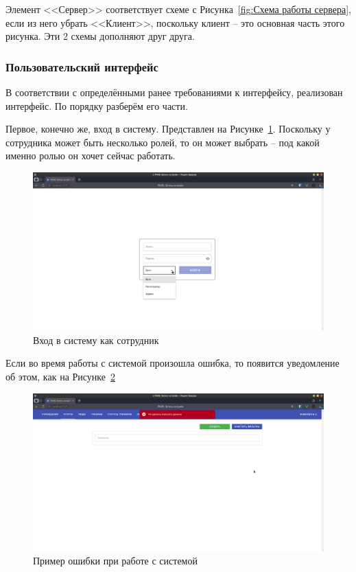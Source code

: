 \documentclass[a4paper,article]{article}
\begin{document}
\begin{sloppypar}
    Элемент <<Сервер>> соответствует схеме с Рисунка~\ref{fig:Схема работы сервера}, если из него убрать <<Клиент>>, поскольку клиент -- это основная часть этого рисунка. Эти 2 схемы дополняют друг друга.

    \subsubsection{Пользовательский интерфейс}\label{Реализация. Клиентская часть. Пользовательский интерфейс}
    
    В соответствии с определёнными ранее требованиями к интерфейсу, реализован интерфейс. По порядку разберём его части. 
    
    Первое, конечно же, вход в систему. Представлен на Рисунке~\ref{fig:uilogin}. Поскольку у сотрудника может быть несколько ролей, то он может выбрать -- под какой именно ролью он хочет сейчас работать.
    
    \begin{figure}[h]
        \centering
        \includegraphics[width=0.8\linewidth]{UI. Вход как сотрудник.png}        
        \caption{\centering Вход в систему как сотрудник}        
        \label{fig:uilogin}        
    \end{figure}
    
    \newpage
    
    Если во время работы с системой произошла ошибка, то появится уведомление об этом, как на Рисунке~\ref{fig:uierror}
    
    \begin{figure}[h]
        \centering
        \includegraphics[width=0.8\linewidth]{UI. Пример ошибки.png}        
        \caption{\centering Пример ошибки при работе с системой}        
        \label{fig:uierror}        
    \end{figure}
    

\end{sloppypar}
\end{document}
